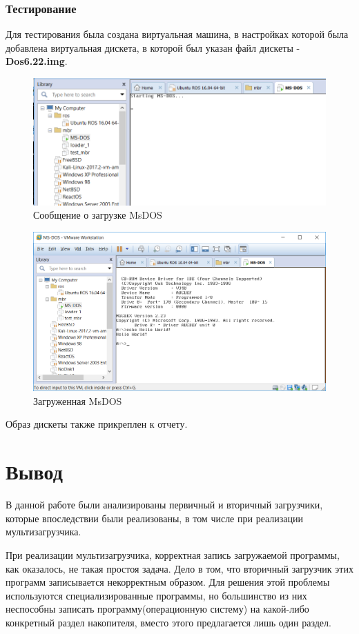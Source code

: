 \subsubsection{Тестирование}
Для тестирования была создана виртуальная машина, в настройках которой была добавлена виртуальная дискета, в которой был указан файл дискеты - \textbf{Dos6.22.img}. 
\begin{figure}[H]
  \centering
  \includegraphics[width=\textwidth]{img/p4/3}
  \caption{Сообщение о загрузке MsDOS}
\end{figure}
\begin{figure}[H]
  \centering
  \includegraphics[width=\textwidth]{img/p4/4}
  \caption{Загруженная MsDOS}
\end{figure}
Образ дискеты также прикреплен к отчету.




\clearpage
\section*{Вывод}
В данной работе были анализированы первичный и вторичный загрузчики, которые впоследствии были реализованы, в том числе при реализации мультизагрузчика.

При реализации мультизагрузчика, корректная запись загружаемой программы, как оказалось, не такая простоя задача. Дело в том, что вторичный загрузчик этих программ записывается некорректным образом. Для решения этой проблемы используются специализированные программы, но большинство из них неспособны записать программу(операционную систему) на какой-либо конкретный раздел накопителя, вместо этого предлагается лишь один раздел.

